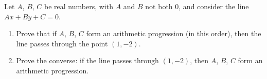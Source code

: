 Let $A$, $B$, $C$ be real numbers, with $A$ and $B$ not both $0$, and consider the line $Ax+By+C=0$.
\begin{enumerate}
\item[(a)] Prove that if $A$, $B$, $C$ form an arithmetic progression (in this order), then the line passes through the point $(1,-2)$.
\item[(b)] Prove the converse: if the line passes through $(1,-2)$, then $A$, $B$, $C$ form an arithmetic progression.
\end{enumerate}
